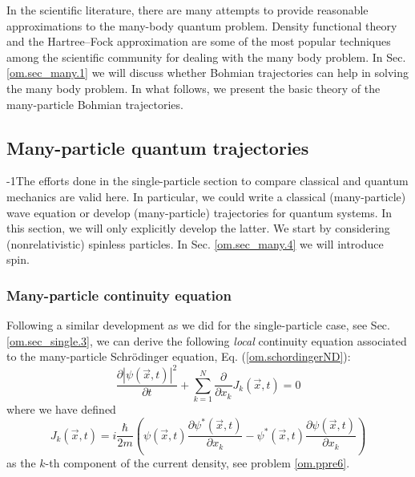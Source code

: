 \documentclass[nofootinbib, secnumarabic, amsmath, nobibnotes,11pt,aps,pra, floatfix]{revtex4-1}
\newcommand{\sref}[1]{Sec. \ref{#1}}
\newcommand{\eref}[1]{Eq. (\ref{#1})}
\begin{document}
In the scientific literature, there are many attempts to provide
reasonable approximations to the many-body quantum problem. Density
functional theory \cite{om.kohn1964,om.kohn1965} and the
Hartree--Fock approximation \cite{om.Hartree,om.Hartree2,om.Fock} are
some of the most popular techniques among the scientific community
for dealing with the many body problem. In \sref{om.sec_many.1} we
will discuss whether Bohmian trajectories can help in solving the
many body problem. In what follows, we present the basic theory of
the many-particle Bohmian trajectories.

\subsection{Many-particle quantum trajectories}\label{om.sec_many.2}

\looseness-1The efforts done in the single-particle section to compare classical
and quantum mechanics are valid here. In particular, we could write
a classical (many-particle) wave equation or develop (many-particle)
trajectories for quantum systems. In this section, we will only
explicitly develop the latter. We start by considering
(nonrelativistic) spinless particles. In \sref{om.sec_many.4} we
will introduce spin.

\subsubsection{Many-particle continuity equation}

Following a similar development as we did for the single-particle
case, see \sref{om.sec_single.3}, we can derive the following
\textit{local} continuity equation associated to the many-particle
Schr\"odinger equation, \eref{om.schordingerND}:
\begin{equation}
\label{om.continuityND}
 \frac{\partial |\psi(\vec{x},t)|^2} {\partial t} + \sum_{k = 1}^{N} \frac { \partial}  {\partial x_k}  J_k(\vec{x},t) = 0  
\end{equation}
where we have defined
\begin{equation}
\label{om.currentND}
J_k(\vec{x},t) = i \frac {\hbar} {2 m} \left(\psi(\vec{x},t) \frac {\partial \psi^{*}(\vec{x},t)} {\partial x_k}- \psi^{*}(\vec{x},t) \frac {\partial \psi(\vec{x},t)} {\partial x_k} \right)
\end{equation}
as the $k$-th component of the current density, see problem \ref{om.ppre6}.
\end{document}
